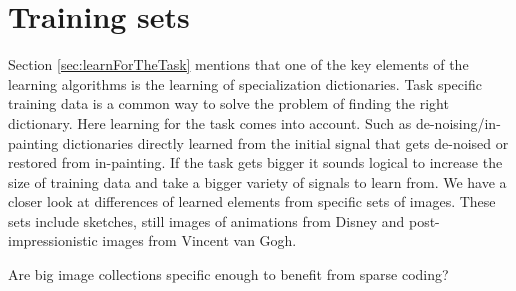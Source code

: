 


\section{Training sets}
Section \ref{sec:learnForTheTask} mentions that one of the key
elements of the learning algorithms is the learning of specialization
dictionaries. Task specific training data is a common way to solve the problem
of finding  the right dictionary. Here learning for the task comes into
account. Such as de-noising/in-painting dictionaries directly learned from the
initial signal that gets de-noised or restored from in-painting. If the task
gets bigger it sounds logical to increase the size of training data and take a
bigger variety of signals to learn from.  We have a closer look at differences
of learned elements from specific sets of images. These sets include sketches,
still images of animations from Disney and post-impressionistic images from
Vincent van Gogh.  

Are big image collections specific enough to benefit from sparse coding?



